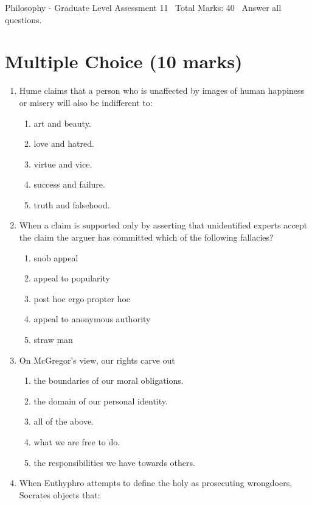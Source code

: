 \documentclass[12pt]{article}
\begin{document}
\begin{center}
Philosophy - Graduate Level Assessment 11 \
Total Marks: 40 \
Answer all questions.
\end{center}

\section*{Multiple Choice (10 marks)}
\begin{enumerate}[label=\arabic*.]
\item Hume claims that a person who is unaffected by images of human happiness or misery will also be indifferent to:
\begin{enumerate}[label=(\alph*)]
    \item art and beauty.
    \item love and hatred.
    \item virtue and vice.
    \item success and failure.
    \item truth and falsehood.
\end{enumerate}
\item When a claim is supported only by asserting that unidentified experts accept the claim the arguer has committed which of the following fallacies?
\begin{enumerate}[label=(\alph*)]
    \item snob appeal
    \item appeal to popularity
    \item post hoc ergo propter hoc
    \item appeal to anonymous authority
    \item straw man
\end{enumerate}
\item On McGregor's view, our rights carve out
\begin{enumerate}[label=(\alph*)]
    \item the boundaries of our moral obligations.
    \item the domain of our personal identity.
    \item all of the above.
    \item what we are free to do.
    \item the responsibilities we have towards others.
\end{enumerate}
\item When Euthyphro attempts to define the holy as prosecuting wrongdoers, Socrates objects that:
\begin{enumerate}[label=(\alph*)]

\end{enumerate}
\end{enumerate}
\end{document}
